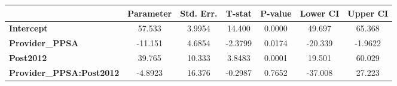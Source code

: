 \begin{center}
\begin{tabular}{lclc}
\bottomrule
\end{tabular}
\begin{tabular}{lcccccc}
                                 & \textbf{Parameter} & \textbf{Std. Err.} & \textbf{T-stat} & \textbf{P-value} & \textbf{Lower CI} & \textbf{Upper CI}  \\
\midrule
\textbf{Intercept}               &       57.533       &       3.9954       &      14.400     &      0.0000      &       49.697      &       65.368       \\
\textbf{Provider\_PPSA}          &      -11.151       &       4.6854       &     -2.3799     &      0.0174      &      -20.339      &      -1.9622       \\
\textbf{Post2012}                &       39.765       &       10.333       &      3.8483     &      0.0001      &       19.501      &       60.029       \\
\textbf{Provider\_PPSA:Post2012} &      -4.8923       &       16.376       &     -0.2987     &      0.7652      &      -37.008      &       27.223       \\
\bottomrule
\end{tabular}
\end{center}